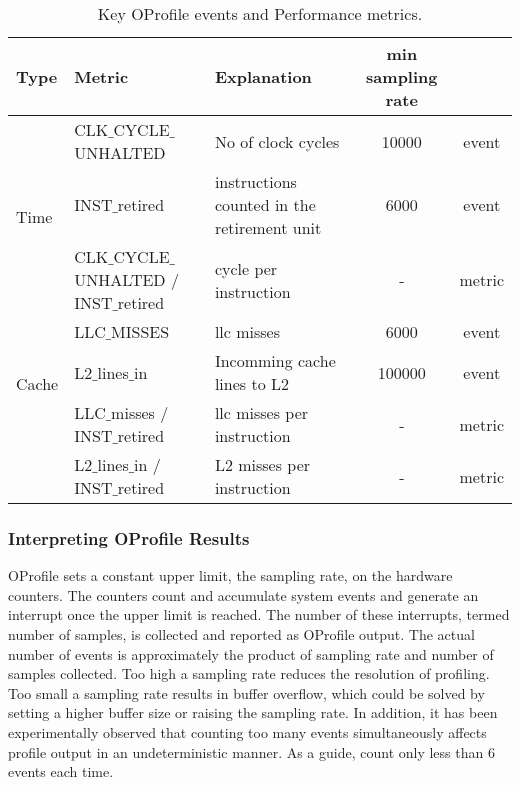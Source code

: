 \documentclass[journal]{IEEEtran}
\begin{document}
\begin{table*}[ht]
\centering
\begin{tabular}{l l l c c}
\hline
Type 					& Metric   			& Explanation  					& min sampling rate	\\
\hline\hline
\multirow{3}{*}{Time}
& CLK$\_$CYCLE$\_$UNHALTED 						& No of clock cycles 				& 10000			& event\\
& INST$\_$retired  							& instructions counted in the retirement unit 	& 6000			& event\\
& CLK$\_$CYCLE$\_$UNHALTED / INST$\_$retired 				& cycle per instruction				& -			& metric\\

\hline

\multirow{3}{*}{Cache}
& LLC$\_$MISSES								& llc misses					& 6000			& event\\
& L2$\_$lines$\_$in							& Incomming cache lines to L2			& 100000		& event\\
& LLC$\_$misses / INST$\_$retired 					& llc misses per instruction			& -			& metric\\
& L2$\_$lines$\_$in / INST$\_$retired 					& L2 misses per instruction 			& -			& metric\\

\hline
\end{tabular}
\caption{Key OProfile events and Performance metrics.}\label{Operfmetrics}
\end{table*}

\subsubsection{Interpreting OProfile Results}
OProfile sets a constant upper limit, the sampling rate, on the hardware counters. The counters count and accumulate system events and generate an interrupt once the upper limit is reached. The number of these interrupts, termed number of samples, is collected and reported as OProfile output. The actual number of events is approximately the product of sampling rate and number of samples collected. Too high a sampling rate reduces the resolution of profiling. Too small a sampling rate results in buffer overflow, which could be solved by setting a higher buffer size or raising the sampling rate. In addition, it has been experimentally observed that counting too many events simultaneously affects profile output in an undeterministic manner. As a guide, count only less than 6 events each time. \\
\end{document}
